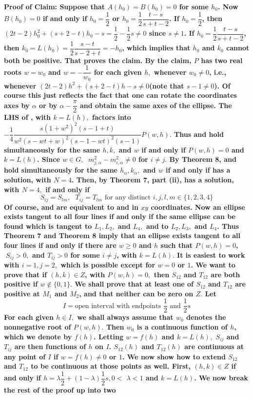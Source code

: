 \bf Proof of Claim: \rm Suppose that $A(h_{0})=B(h_{0})=0$ for some $h_{0}$. Now $B(h_{0})=0$ if and only if $h_{0}=\dfrac{1}{2}$ or $h_{0}=\dfrac{1}{2}\dfrac{t-s}{s+t-2}$. If $h_{0}=\dfrac{1}{2}$, then $\left( 2t-2\right) h_{0}^{2}+\left( s+2-t\right) h_{0}-s=\allowbreak \dfrac{1}{2}-\dfrac{1}{2}s\neq 0$ since $s\neq 1$. If $h_{0}=\dfrac{1}{2}\dfrac{t-s}{s+t-2}$, then $k_{0}=L(h_{0})=\allowbreak \dfrac{1}{2}\dfrac{s-t}{s-2+t}=-h_{0}$, which implies that $h_{0}$ and $k_{0}$ cannot both be positive. That proves the claim. \nl By the claim, $P$ has two \bf real \rm roots $w=w_{0}$ and $w=-\dfrac{1}{w_{0}}$ for each given $h,$ whenever $w_{0}\neq 0$, i.e., whenever $\left( 2t-2\right) h^{2}+\left( s+2-t\right) h-s\neq 0$(note that $s-1\neq 0$). Of course this just reflects the fact that one can rotate the coordinates axes by $\alpha $ or by $\alpha -\dfrac{\pi }{2}$ and obtain the same axes of the ellipse. The LHS of , with $k=L(h),$ factors into $-\dfrac{1}{4}\dfrac{s\left( 1+w^{2}\right) ^{2}\left( s-1+t\right) }{w^{2}\left( s-wt+w\right) ^{2}\left( s-1-wt\right) ^{2}\left( s-1\right) }P(w,h).$ Thus   and  hold simultaneously for the same $h,k,$ and $w$ if and only if $P(w,h)=0$ and $k=L(h)$. Since $w\in G,$ $\ m_{j,\alpha }^{2}-m_{i,\alpha }^{2}\neq 0$ for $i\neq j.$ By Theorem 8,   and  hold simultaneously for the same $h_{\alpha },k_{\alpha },$ and $w$ if and only if  has a solution, with $N=4$. Then, by Theorem 7, part (ii),  has a solution, with $N=4,$ if and only if $$S_{ij}=S_{lm},\text{ }T_{ij}=T_{lm}\text{ for any distinct }i,j,l,m\in \{1,2,3,4\}\tag{33}$$ Of course,   and  are equivalent to   and  in $xy$ coordinates. Now an ellipse exists tangent to all four lines if and only if the same ellipse can be found which is tangent to $L_{1},L_{2},$ and $L_{4},$ and to $L_{2},L_{3},$ and $L_{4}$. Thus Theorem 7 and Theorem 8 imply that an ellipse exists tangent to all four lines if and only if there are $w\geq 0$ and $h$ such that $P(w,h)=0$,$\;S_{ij}>0,$ and $T_{ij}>0$ for some $i\neq j$, with $k=L(h).$ It is easiest to work with $i=1, j=2,$ which is possible except for $w=0$ or $1$. We want to prove that if $(h,k)\in Z$, with $P(w,h)=0,$ then $S_{12}$ and $T_{12}$ are \bf both positive \rm if $w\notin \{0,1\}.$ We shall prove that at least one of $S_{12}$ and $T_{12}$ are positive at $M_{1}$ and $M_{2}$, and that neither can be zero on $Z.$ Let $$I=\text{open interval with endpoints }\dfrac{1}{2}\text{ and }\dfrac{1}{2}s$$ For each given $h\in I,$ we shall always assume that $w_{0}$ denotes the \bf nonnegative \rm root of $P(w,h).$ Then $w_{0}$ is a continuous function of $h$, which we denote by $f(h)$. Letting $w=f(h)$ and $k=L(h),$ $S_{ij}$ and $T_{ij}$ are then functions of $h$ on $I$. $S_{12}(h)$ and $T_{12}(h)$ are continuous at any point of $I$ if $w=f(h)\neq 0$ or $1$. We now show how to extend $S_{12}$ and $T_{12}$ to be continuous at those points as well. First, $(h,k)\in Z$ if and only if $h=\lambda \dfrac{1}{2}+(1-\lambda )\dfrac{1}{2}s,0<$ $\lambda <1$ and $k=L(h)$. We now break the rest of the proof up into two 